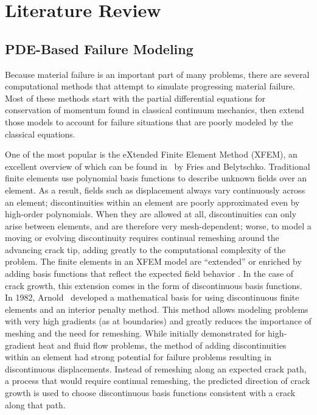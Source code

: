 \chapter{Literature Review}
\label{ch:LitReview}
\section{PDE-Based Failure Modeling}
Because material failure is an important part of many problems, there are several computational methods that attempt to simulate progressing material failure. 
Most of these methods start with the partial differential equations for conservation of momentum found in classical continuum mechanics, then extend those models to account for failure situations that are poorly modeled by the classical equations.

One of the most popular is the eXtended Finite Element Method (XFEM), an excellent overview of which can be found in~\cite{fries2010extended} by Fries and Belytschko.
Traditional finite elements use polynomial basis functions to describe unknown fields over an element.
As a result, fields such as displacement always vary continuously across an element; discontinuities within an element are poorly approximated even by high-order polynomials.
When they are allowed at all, discontinuities can only arise between elements, and are therefore very mesh-dependent; worse, to model a moving or evolving discontinuity requires continual remeshing around the advancing crack tip, adding greatly to the computational complexity of the problem.
The finite elements in an XFEM model are ``extended'' or enriched by adding basis functions that reflect the expected field behavior . 
In the case of crack growth, this extension comes in the form of discontinuous basis functions.
In 1982, Arnold~\cite{arnold1982interior} developed a mathematical basis for using discontinuous finite elements and an interior penalty method.
This method allows modeling problems with very high gradients (as at boundaries) and greatly reduces the importance of meshing and the need for remeshing.
While initially demonstrated for high-gradient heat and fluid flow problems, the method of adding discontinuities within an element had strong potential for failure problems resulting in discontinuous displacements.
Instead of remeshing along an expected crack path, a process that would require continual remeshing, the predicted direction of crack growth is used to choose discontinuous basis functions consistent with a crack along that path.

